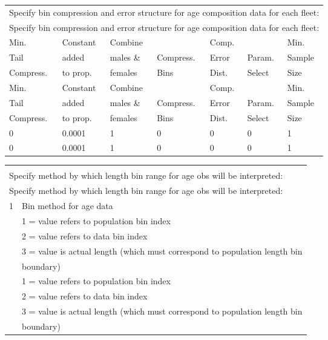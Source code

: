 \begin{tabular}{p{2cm} p{2cm} p{2cm} p{1.5cm} p{1.5cm} p{2cm} p{2cm}}
		\multicolumn{7}{l}{Specify bin compression and error structure for age composition data for each fleet:} \\
		\multicolumn{7}{l}{Specify bin compression and error structure for age composition data for each fleet:} \\
		\hline
		Min.      & Constant & Combine   &           & Comp. &           & Min. \Tstrut\\
		Tail      & added    & males \&  & Compress. & Error & Param.    & Sample \\
		Compress. & to prop. & females   & Bins      & Dist. & Select    & Size \Bstrut\\
		Min.      & Constant & Combine   &           & Comp. &           & Min. \Tstrut\\
		Tail      & added    & males \&  & Compress. & Error & Param.    & Sample \\
		Compress. & to prop. & females   & Bins      & Dist. & Select    & Size \Bstrut\\
		\hline
		0 & 0.0001 & 1 & 0 & 0 & 0 & 1 \Tstrut\\
		0 & 0.0001 & 1 & 0 & 0 & 0 & 1 \Bstrut\\
		\hline
\end{tabular}

			
\begin{tabular}{p{1cm} p{14cm}}
	 & \\
	\multicolumn{2}{l}{Specify method by which length bin range for age obs will be interpreted:} \\
	\multicolumn{2}{l}{Specify method by which length bin range for age obs will be interpreted:} \\
	\hline
	1 & Bin method for age data \Tstrut\\
	  & 1 = value refers to population bin index \\
	  & 2 = value refers to data bin index \\
	  & 3 = value is actual length (which must correspond to population length bin \\
	  & boundary) \Bstrut\\
	  & 1 = value refers to population bin index \\
	  & 2 = value refers to data bin index \\
	  & 3 = value is actual length (which must correspond to population length bin \\
	  & boundary) \Bstrut\\
	 \hline
\end{tabular}


